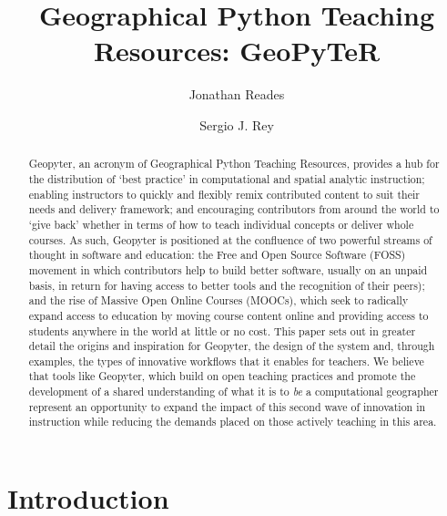 \documentclass[letter, 11pt,titlepage]{article}
\title{Geographical Python Teaching Resources: GeoPyTeR}
\author{Jonathan Reades \and Sergio J. Rey}
\begin{document}
\maketitle

\begin{abstract}
Geopyter, an acronym of Geographical Python Teaching Resources, provides
a hub for the distribution of `best practice' in computational and
spatial analytic instruction; enabling instructors to quickly and
flexibly remix contributed content to suit their needs and delivery
framework; and encouraging contributors from around the world to `give
back' whether in terms of how to teach individual concepts or deliver
whole courses. As such, Geopyter is positioned at the confluence of two
powerful streams of thought in software and education: the Free and Open
Source Software (FOSS) movement in which contributors help to build
better software, usually on an unpaid basis, in return for having access
to better tools and the recognition of their peers); and the rise of
Massive Open Online Courses (MOOCs), which seek to radically expand
access to education by moving course content online and providing access
to students anywhere in the world at little or no cost. This paper sets
out in greater detail the origins and inspiration for Geopyter, the
design of the system and, through examples, the types of innovative
workflows that it enables for teachers. We believe that tools like
Geopyter, which build on open teaching practices and promote the
development of a shared understanding of what it is to \emph{be} a
computational geographer represent an opportunity to expand the impact
of this second wave of innovation in instruction while reducing the
demands placed on those actively teaching in this area.
\end{abstract}


\section{Introduction}\label{introduction}
\end{document}

